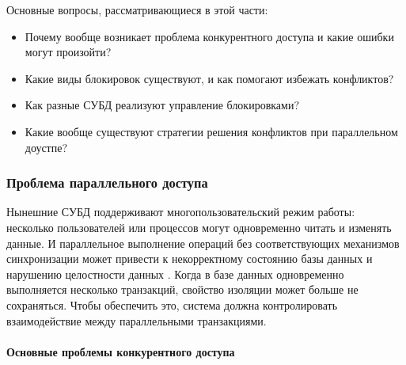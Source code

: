 Основные вопросы, рассматривающиеся в этой части:
\begin{itemize}
		\item Почему вообще возникает проблема конкурентного доступа и какие ошибки могут произойти?
		\item Какие виды блокировок существуют, и как помогают избежать конфликтов?
    \item Как разные СУБД реализуют управление блокировками?
    \item Какие вообще существуют стратегии решения конфликтов при параллельном доустпе?
\end{itemize}

\subsubsection{Проблема параллельного доступа}

Нынешние СУБД поддерживают многопользовательский режим работы: несколько пользователей или процессов могут одновременно читать и изменять данные. И параллельное выполнение операций без соответствующих механизмов синхронизации может привести к некорректному состоянию базы данных и нарушению целостности данных \autocite{ElmasriNavathe, Silberschatz}.
Когда в базе данных одновременно выполняется несколько транзакций, свойство изоляции может больше не сохраняться. Чтобы обеспечить это, система должна контролировать взаимодействие между параллельными транзакциями. \autocite{Silberschatz}

\paragraph{Основные проблемы конкурентного доступа} ~\\

